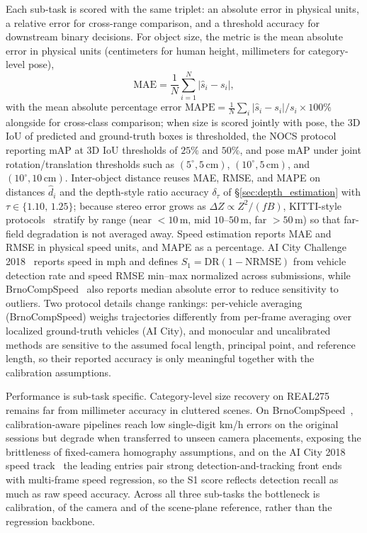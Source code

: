 Each sub-task is scored with the same triplet: an absolute error in physical units, a relative error for cross-range comparison, and a threshold accuracy for downstream binary decisions. For object size, the metric is the mean absolute error in physical units (centimeters for human height, millimeters for category-level pose),
\begin{equation}
    \mathrm{MAE} = \frac{1}{N}\sum_{i=1}^{N} |\hat{s}_i - s_i|,
\end{equation}
with the mean absolute percentage error $\mathrm{MAPE} = \tfrac{1}{N}\sum_i |\hat{s}_i - s_i|/s_i \times 100\%$ alongside for cross-class comparison; when size is scored jointly with pose, the 3D IoU of predicted and ground-truth boxes is thresholded, the NOCS protocol~\cite{Wang0HVSG19} reporting mAP at 3D IoU thresholds of $25\%$ and $50\%$, and pose mAP under joint rotation/translation thresholds such as $(5^\circ,5\,\mathrm{cm})$, $(10^\circ,5\,\mathrm{cm})$, and $(10^\circ,10\,\mathrm{cm})$. Inter-object distance reuses MAE, RMSE, and MAPE on distances $\hat{d}_i$ and the depth-style ratio accuracy $\delta_\tau$ of \S\ref{sec:depth_estimation} with $\tau \in \{1.10,\,1.25\}$; because stereo error grows as $\Delta Z \propto Z^2/(fB)$, KITTI-style protocols~\cite{Geiger2013KITTI} stratify by range (near $<10$\,m, mid $10$--$50$\,m, far $>50$\,m) so that far-field degradation is not averaged away. Speed estimation reports MAE and RMSE in physical speed units, and MAPE as a percentage. AI City Challenge 2018~\cite{Naphade_2018_CVPR_Workshops} reports speed in mph and defines $S_1=\mathrm{DR}(1-\mathrm{NRMSE})$ from vehicle detection rate and speed RMSE min--max normalized across submissions, while BrnoCompSpeed~\cite{SochorJSMSHZ17} also reports median absolute error to reduce sensitivity to outliers. Two protocol details change rankings: per-vehicle averaging (BrnoCompSpeed) weighs trajectories differently from per-frame averaging over localized ground-truth vehicles (AI City), and monocular and uncalibrated methods are sensitive to the assumed focal length, principal point, and reference length, so their reported accuracy is only meaningful together with the calibration assumptions.

Performance is sub-task specific. Category-level size recovery on REAL275~\cite{Wang0HVSG19} remains far from millimeter accuracy in cluttered scenes. On BrnoCompSpeed~\cite{SochorJSMSHZ17}, calibration-aware pipelines reach low single-digit km/h errors on the original sessions but degrade when transferred to unseen camera placements, exposing the brittleness of fixed-camera homography assumptions, and on the AI City 2018 speed track~\cite{Naphade_2018_CVPR_Workshops} the leading entries pair strong detection-and-tracking front ends with multi-frame speed regression, so the S1 score reflects detection recall as much as raw speed accuracy. Across all three sub-tasks the bottleneck is calibration, of the camera and of the scene-plane reference, rather than the regression backbone.

